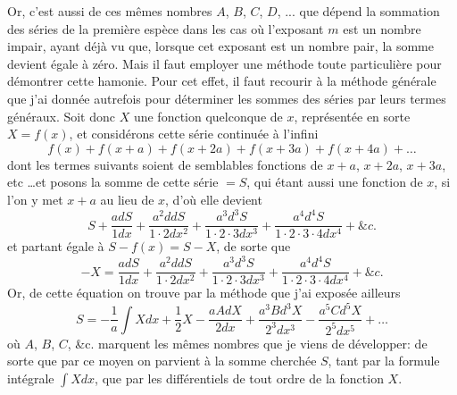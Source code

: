 \documentclass[12pt]{article}
\theoremstyle{definition}
\begin{document}
Or, c'est aussi de ces mêmes nombres $A$, $B$, $C$, $D$, $...$ que dépend la sommation des séries de la première espèce dans les cas où l'exposant $m$ est un nombre impair, ayant déjà vu que, lorsque cet exposant est un nombre pair, la somme devient égale à zéro. Mais il faut employer une méthode toute particulière pour démontrer cette hamonie. Pour cet effet, il faut recourir à la méthode générale que j'ai donnée autrefois pour déterminer les sommes des séries par leurs termes généraux. Soit donc $X$ une fonction quelconque de $x$, représentée en sorte $X = f(x)$, et considérons cette série continuée à l'infini
$$f(x) + f(x + a) + f(x + 2a) + f(x + 3a) + f(x + 4a) + \dots$$
dont les termes suivants soient de semblables fonctions de $x + a$, $x + 2a$, $x + 3a$, etc \dots et posons la somme de cette série $= S$, qui étant aussi une fonction de $x$, si l'on y met $x + a$ au lieu de $x$, d'où elle devient
$$S + \frac{adS}{1dx} + \frac{a^2 ddS}{1\cdot 2 dx^2} + \frac{a^3 d^3S}{1\cdot 2\cdot 3 dx^3} + \frac{a^4 d^4S}{1\cdot 2\cdot 3 \cdot 4 dx^4} + \&c.$$
et partant égale à $S - f(x) = S - X$, de sorte que 
$$-X = \frac{adS}{1dx} + \frac{a^2 ddS}{1\cdot 2 dx^2} + \frac{a^3 d^3S}{1\cdot 2\cdot 3 dx^3} + \frac{a^4 d^4S}{1\cdot 2\cdot 3 \cdot 4 dx^4} + \&c.$$
Or, de cette équation on trouve par la méthode que j'ai exposée ailleurs
$$S = - \frac{1}{a}\int X dx + \frac{1}{2}X  - \frac{aAdX}{2dx} + \frac{a^3Bd^3X}{2^3 dx^3} - \frac{a^5 C d^5 X}{2^5 dx^5} + \dots$$
où $A$, $B$, $C$, \&c. marquent les mêmes nombres que je viens de développer: de sorte que par ce moyen on parvient à la somme cherchée $S$, tant par la formule intégrale $\int X dx$, que par les différentiels de tout ordre de la fonction $X$.
\end{document}
